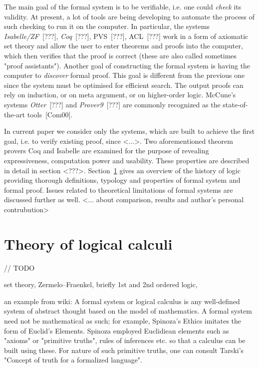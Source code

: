 \documentclass[article]{aaltoseries}
\begin{document}
The main goal of the formal system is to be verifiable, i.e. one could \textit{check} its validity. At present, a lot of tools are being developing to automate the process of such checking to run it on the computer. In particular, the systems \textit{Isabelle/ZF}~[???], \textit{Coq}~[???], PVS~[???], ACL~[???] work in a form of axiomatic set theory and allow the user to enter theorems and proofs into the computer, which then verifies that the proof is correct (these are also called sometimes "proof assistants").
Another goal of constructing the formal system is having the computer to \textit{discover} formal proof. This goal is different from the previous one since the system must be optimised for efficient search. The output proofs can rely on induction, or on meta argument, or on higher-order logic. McCune’s systems \textit{Otter}~[???] and \textit{Prover9}~[???] are commonly recognized as the state-of-the-art tools~[Com00].

In current paper we consider only the systems, which are built to achieve the first goal, i.e. to verify existing proof, since <...>. Two aforementioned theorem provers Coq and Isabelle are examined for the purpose of revealing expressiveness, computation power and usability. These properties are described in detail in section <???>. Section~\ref{sec:formal_theory} gives an overview of the history of logic providing thorough definitions, typology and properties of formal system and formal proof. Issues related to theoretical limitations of formal systems are discussed further as well. <... about comparison, results and author's personal contrubution>


\section{Theory of logical calculi}
\label{sec:formal_theory}
// TODO

set theory, Zermelo–Fraenkel, briefly 1st and 2nd ordered logic, 

an example from wiki: A formal system or logical calculus is any well-defined system of abstract thought based on the model of mathematics. A formal system need not be mathematical as such; for example, Spinoza's Ethics imitates the form of Euclid's Elements. Spinoza employed Euclidiean elements such as "axioms" or "primitive truths", rules of inferences etc. so that a calculus can be built using these. For nature of such primitive truths, one can consult Tarski's "Concept of truth for a formalized language".
\end{document}
